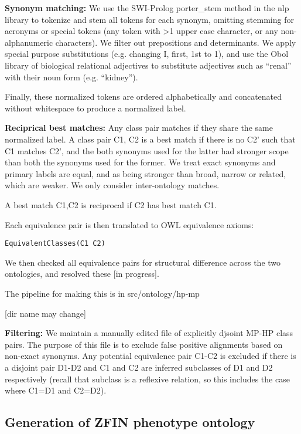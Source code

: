 \textbf{Synonym matching:} We use the SWI-Prolog porter_stem method in
the nlp library to tokenize and stem all tokens for each synonym,
omitting stemming for acronyms or special tokens (any token with >1
upper case character, or any non-alphanumeric characters). We filter
out prepositions and determinants. We apply special purpose
substitutions (e.g. changing I, first, 1st to 1), and use the Obol
library of biological relational adjectives to substitute adjectives
such as ``renal'' with their noun form (e.g. ``kidney'').

Finally, these normalized tokens are ordered alphabetically and
concatenated without whitespace to produce a normalized label.

\textbf{Reciprical best matches:} Any class pair matches if they share
the same normalized label. A class pair C1, C2 is a best match if
there is no C2' such that C1 matches C2', and the both synonyms used
for the latter had stronger scope than both the synonyms used for the
former. We treat exact synonyms and primary labels are equal, and as
being stronger than broad, narrow or related, which are weaker. We
only consider inter-ontology matches.

A best match C1,C2 is reciprocal if C2 has best match C1.

Each equivalence pair is then translated to OWL equivalence axioms:

\begin{verbatim}
EquivalentClasses(C1 C2)
\end{verbatim}

We then checked all equivalence pairs for structural difference across
the two ontologies, and resolved these [in progress].

The pipeline for making this is in src/ontology/hp-mp

[dir name may change]

\textbf{Filtering:} We maintain a manually edited file of explicitly
djsoint MP-HP class pairs. The purpose of this file is to exclude
false positive alignments based on non-exact synonyms. Any potential
equivalence pair C1-C2 is excluded if there is a disjoint pair D1-D2
and C1 and C2 are inferred subclasses of D1 and D2 respectively
(recall that subclass is a reflexive relation, so this includes the
case where C1=D1 and C2=D2).

\subsection{Generation of ZFIN phenotype ontology}

